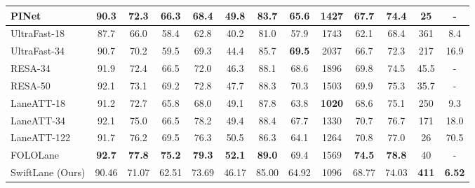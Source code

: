 \documentclass[conference]{IEEEtran}
\begin{document}
\begin{table*}[t]
\begin{center}
\begin{tabular}{|@{}l|c|c|c|c|c|c|c|c|c|c|c|@{}c|}
 \hline
  PINet \cite{pinet_2021}             & 90.3          & 72.3          & 66.3          & 68.4          & 49.8          & 83.7          & 65.6          & 1427          & 67.7          & 74.4          & 25    & - \\
 \hline
 UltraFast-18\cite{qin2020ultra}    & 87.7          & 66.0          & 58.4          & 62.8          & 40.2          & 81.0          & 57.9          & 1743          & 62.1          & 68.4          & 361   & 8.4\\
 UltraFast-34\cite{qin2020ultra}    & 90.7          & 70.2          & 59.5          & 69.3          & 44.4          & 85.7          & \textbf{69.5} & 2037          & 66.7          & 72.3          & 217   & 16.9 \\
 \hline
RESA-34 \cite{resa_2020}         & 91.9          & 72.4          & 66.5          & 72.0          & 46.3          & 88.1          & 68.6          & 1896          & 69.8          & 74.5          & 45.5  & - \\
 RESA-50 \cite{resa_2020}         & 92.1          & 73.1          & 69.2          & 72.8          & 47.7          & 88.3          & 70.3          & 1503          & 69.9          & 75.3          & 35.7  & - \\
\hline
 LaneATT-18\cite{tabelini2021keep}  & 91.2          & 72.7          & 65.8          & 68.0          & 49.1          & 87.8          & 63.8          & \textbf{1020} & 68.6          & 75.1          & 250   & 9.3 \\
 LaneATT-34\cite{tabelini2021keep}  & 92.1          & 75.0          & 66.5          & 78.2          & 49.4          & 88.4          & 67.7          & 1330          & 70.7          & 76.7          & 171   & 18.0\\
 LaneATT-122\cite{tabelini2021keep} & 91.7          & 76.2          & 69.5          & 76.3          & 50.5          & 86.3          & 64.1          & 1264          & 70.8          & 77.0          & 26    & 70.5\\
 \hline
FOLOLane \cite{FOLO_2021_CVPR}    & \textbf{92.7} & \textbf{77.8} & \textbf{75.2} & \textbf{79.3} & \textbf{52.1} & \textbf{89.0} & 69.4          & 1569          & \textbf{74.5} & \textbf{78.8} & 40    & -\\
\hline
 SwiftLane (Ours)                   & 90.46         & 71.07         & 62.51         & 73.69         & 46.17         & 85.00         & 64.92         & 1096          & 68.77         & 74.03         & \textbf{411} & \textbf{6.52}\\
 \hline

\end{tabular} 
\vspace{-2ex}
\end{center}
\end{table*}
\end{document}
